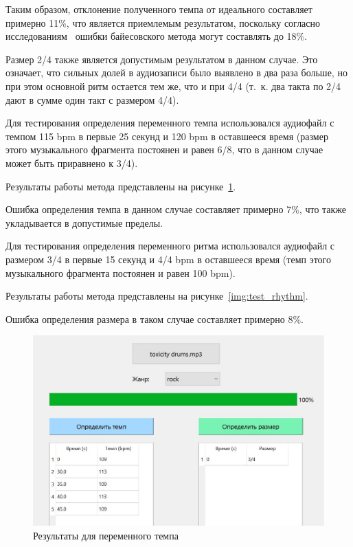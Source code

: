 Таким образом, отклонение полученного темпа от идеального составляет примерно 11\%, что является приемлемым результатом, поскольку согласно исследованиям~\cite{bayesian} ошибки байесовского метода могут составлять до 18\%.

Размер 2/4 также является допустимым результатом в данном случае. Это означает, что сильных долей в аудиозаписи было выявлено в два раза больше, но при этом основной ритм остается тем же, что и при 4/4 (т.~к. два такта по 2/4 дают в сумме один такт с размером 4/4).

Для тестирования определения переменного темпа использовался аудиофайл с темпом 115 bpm в первые 25 секунд и 120 bpm в оставшееся время (размер этого музыкального фрагмента постоянен и равен 6/8, что в данном случае может быть приравнено к 3/4).

Результаты работы метода представлены на рисунке~\ref{img:test_tempo}.

Ошибка определения темпа в данном случае составляет примерно 7\%, что также укладывается в допустимые пределы.

Для тестирования определения переменного ритма использовался аудиофайл с размером 3/4 в первые 15 секунд и 4/4 bpm в оставшееся время (темп этого музыкального фрагмента постоянен и равен 100 bpm).

Результаты работы метода представлены на рисунке~\ref{img:test_rhythm}.

Ошибка определения размера в таком случае составляет примерно 8\%.

\begin{figure}[h]
	\centering
	\includegraphics[scale=0.85]{inc/img/test_tempo.jpg}
	\caption{Результаты для переменного темпа}
	\label{img:test_tempo}
\end{figure}

